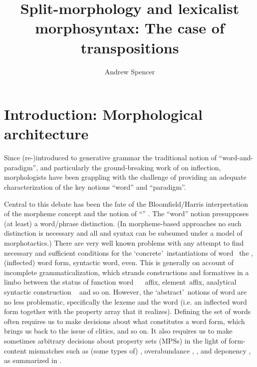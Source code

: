\documentclass[output=paper,
modfonts
]{LSP/langsci}
\author{Andrew Spencer\affiliation{University of Essex}}
\title{Split-morphology and lexicalist morphosyntax: The case of transpositions}
\begin{document}
\maketitle

\newpage 
\section{Introduction: Morphological architecture}\label{sec:architecture}
\largerpage
Since \citet{AndersonSR77:inflection}
(re-)introduced to generative grammar the traditional notion of ``word-and-paradigm'', 
and particularly the ground-breaking work of  \citet{Matthews72}
on    %
inflection, morphologists have been grappling with the challenge of providing an adequate characterization of the key notions ``word'' and ``paradigm''.%

Central to this debate has been the fate of the Bloomfield/Harris %
interpretation of the morpheme 
concept  \parencite{AndersonSR15:morpheme}
and the notion of ``''  
\parencite{Beard95:book}.
The ``word'' notion presupposes (at least) a word/phrase distinction. (In morpheme-based approaches no such distinction is necessary and all  and syntax can be subsumed under a model of morphotactics.) There are very well known problems with any attempt to find necessary and sufficient conditions for the \textquoteleft concrete\textquoteright\ instantiations of word \textemdash\ the , (inflected) word form, syntactic word, even. This is generally on account of incomplete grammaticalization, which strands constructions and formatives in a limbo between the status of function word \textendash\  \textendash\ affix,
 element\textendash\ affix, analytical syntactic construction \textendash\  
and so on. However, the \textquoteleft abstract\textquoteright\ notions of word are no less problematic, specifically the lexeme and the  word (i.e. an inflected word form together with the  property array that it realizes).  Defining the set of  words often requires us to make decisions about what constitutes a word form, which brings us back to the issue of clitics,  and so on. It also requires us to make sometimes arbitrary decisions about  property sets (MPSs) in the light of form-content mismatches such as (some types of)  \parencite{Baerman:etal05:book}, %
overabundance \parencite{Thornton12:overabundance}, %
 \parencite{Sims15:book}, %
and deponency  \parencite{Baerman:etal07}, %
as summarized in \citet{Stump16:book}.
\end{document}
